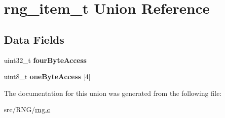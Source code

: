 \hypertarget{unionrng__item__t}{}\section{rng\+\_\+item\+\_\+t Union Reference}
\label{unionrng__item__t}
\subsection*{Data Fields}
\begin{DoxyCompactItemize}
\item 
uint32\+\_\+t {\bfseries four\+Byte\+Access}\hypertarget{unionrng__item__t_a0a51b96cd69bb3e896e403a112af1e85}{}\label{unionrng__item__t_a0a51b96cd69bb3e896e403a112af1e85}

\item 
uint8\+\_\+t {\bfseries one\+Byte\+Access} \mbox{[}4\mbox{]}\hypertarget{unionrng__item__t_af0165aca2ea909be2e5a547afff896af}{}\label{unionrng__item__t_af0165aca2ea909be2e5a547afff896af}

\end{DoxyCompactItemize}


The documentation for this union was generated from the following file\+:\begin{DoxyCompactItemize}
\item 
src/\+R\+N\+G/\hyperlink{rng_8c}{rng.\+c}\end{DoxyCompactItemize}
